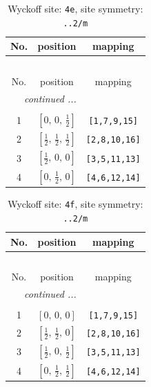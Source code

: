\documentclass[fleqn,8pt]{jsarticle}
\begin{document}
\renewcommand{\arraystretch}{1.2}
\begin{longtable}{ccc}
\caption{Wyckoff site: {\tt 4e}, site symmetry: {\tt ..2/m}}
 \\
 \hline \hline
No. & position & mapping \\ \hline \endfirsthead

\multicolumn{2}{l}{\tablename\ \thetable{}} \\
 \hline \hline
No. & position & mapping \\ \hline \endhead

 \hline \hline
\multicolumn{2}{r}{\footnotesize\it continued ...} \\ \endfoot

 \hline \hline
\multicolumn{2}{r}{} \\ \endlastfoot

1 & $\left[ 0,\, 0,\, \frac{1}{2} \right]$ & {\tt [1,7,9,15]} \\ \hline
2 & $\left[ \frac{1}{2},\, \frac{1}{2},\, \frac{1}{2} \right]$ & {\tt [2,8,10,16]} \\ \hline
3 & $\left[ \frac{1}{2},\, 0,\, 0 \right]$ & {\tt [3,5,11,13]} \\ \hline
4 & $\left[ 0,\, \frac{1}{2},\, 0 \right]$ & {\tt [4,6,12,14]} \\
\end{longtable}
\renewcommand{\arraystretch}{1.2}
\begin{longtable}{ccc}
\caption{Wyckoff site: {\tt 4f}, site symmetry: {\tt ..2/m}}
 \\
 \hline \hline
No. & position & mapping \\ \hline \endfirsthead

\multicolumn{2}{l}{\tablename\ \thetable{}} \\
 \hline \hline
No. & position & mapping \\ \hline \endhead

 \hline \hline
\multicolumn{2}{r}{\footnotesize\it continued ...} \\ \endfoot

 \hline \hline
\multicolumn{2}{r}{} \\ \endlastfoot

1 & $\left[ 0,\, 0,\, 0 \right]$ & {\tt [1,7,9,15]} \\ \hline
2 & $\left[ \frac{1}{2},\, \frac{1}{2},\, 0 \right]$ & {\tt [2,8,10,16]} \\ \hline
3 & $\left[ \frac{1}{2},\, 0,\, \frac{1}{2} \right]$ & {\tt [3,5,11,13]} \\ \hline
4 & $\left[ 0,\, \frac{1}{2},\, \frac{1}{2} \right]$ & {\tt [4,6,12,14]} \\
\end{longtable}
\end{document}
